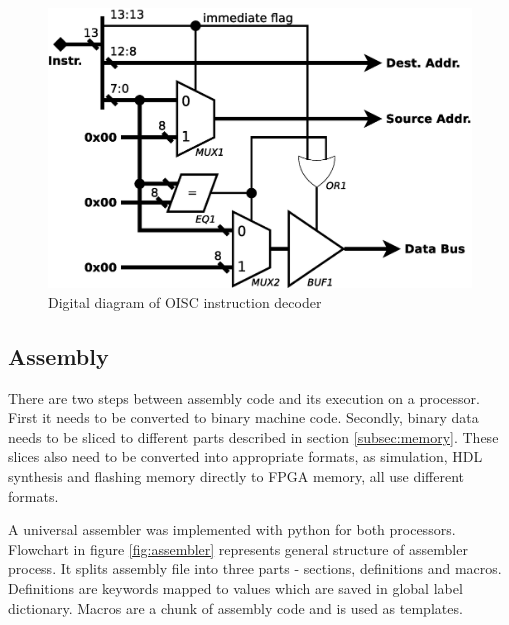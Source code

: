 \begin{figure}[t]
	\centering
	\includegraphics[scale=0.4]{../resources/oisc_decoder.eps}
	\caption{Digital diagram of OISC instruction decoder}
	\label{fig:oisc_decoder}
\end{figure}

\subsection{Assembly}\label{subsec:assembly}
There are two steps between assembly code and its execution on a processor. First it needs to be converted to binary machine code. Secondly, binary data needs to be sliced to different parts described in section \ref{subsec:memory}. These slices also need to be converted into appropriate formats, as simulation, HDL synthesis and flashing memory directly to FPGA memory, all use different formats.

A universal assembler was implemented with python for both processors. Flowchart in figure \ref{fig:assembler} represents general structure of assembler process. It splits assembly file into three parts - sections, definitions and macros. Definitions are keywords mapped to values which are saved in global label dictionary. Macros are a chunk of assembly code and is used as templates. 


